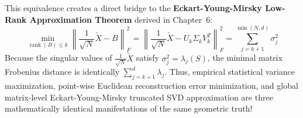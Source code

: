 This equivalence creates a direct bridge to the \textbf{Eckart-Young-Mirsky Low-Rank Approximation Theorem} derived in Chapter~6:
\begin{equation}
\min_{\operatorname{rank}(B) \le k} \left\| \frac{1}{\sqrt{N}}\tilde{X} - B \right\|_F^2 = \left\| \frac{1}{\sqrt{N}}\tilde{X} - U_k \Sigma_k V_k^T \right\|_F^2 = \sum_{j=k+1}^{\min(N, d)} \sigma_j^2
\end{equation}
Because the singular values of $\frac{1}{\sqrt{N}}\tilde{X}$ satisfy $\sigma_j^2 = \lambda_j(S)$, the minimal matrix Frobenius distance is identically $\sum_{j=k+1}^d \lambda_j$. 
Thus, empirical statistical variance maximization, point-wise Euclidean reconstruction error minimization, and global matrix-level Eckart-Young-Mirsky truncated SVD approximation are three mathematically identical manifestations of the same geometric truth!

